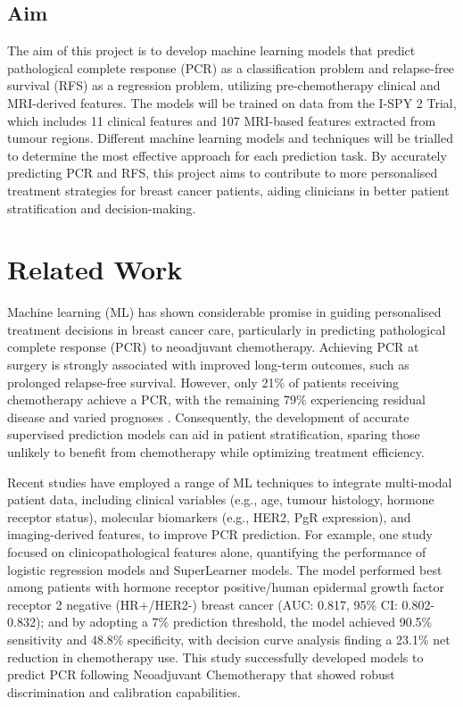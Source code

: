 \documentclass{article}
\begin{document}
\subsection{Aim}

The aim of this project is to develop machine learning models that predict pathological complete response (PCR) as a classification problem and relapse-free survival (RFS) as a regression problem, utilizing pre-chemotherapy clinical and MRI-derived features. The models will be trained on data from the I-SPY 2 Trial\cite{newitt2021acr}, which includes 11 clinical features and 107 MRI-based features extracted from tumour regions. Different machine learning models and techniques will be trialled to determine the most effective approach for each prediction task. By accurately predicting PCR and RFS, this project aims to contribute to more personalised treatment strategies for breast cancer patients, aiding clinicians in better patient stratification and decision-making.

\section{Related Work}

Machine learning (ML) has shown considerable promise in guiding personalised treatment decisions in breast cancer care, particularly in predicting pathological complete response (PCR) to neoadjuvant chemotherapy. Achieving PCR at surgery is strongly associated with improved long-term outcomes, such as prolonged relapse-free survival. However, only 21\% of patients receiving chemotherapy achieve a PCR, with the remaining 79\% experiencing residual disease and varied prognoses \cite{spring2020pathologic}. Consequently, the development of accurate supervised prediction models can aid in patient stratification, sparing those unlikely to benefit from chemotherapy while optimizing treatment efficiency.

Recent studies have employed a range of ML techniques to integrate multi-modal patient data, including clinical variables (e.g., age, tumour histology, hormone receptor status), molecular biomarkers (e.g., HER2, PgR expression), and imaging-derived features, to improve PCR prediction. For example, one study \cite{Zhao2024} focused on clinicopathological features alone, quantifying the performance of logistic regression models and SuperLearner models. The model performed best among patients with hormone receptor positive/human epidermal growth factor receptor 2 negative (HR+/HER2-) breast cancer (AUC: 0.817, 95\% CI: 0.802-0.832); and by adopting a 7\% prediction threshold, the model achieved 90.5\% sensitivity and 48.8\% specificity, with decision curve analysis finding a 23.1\% net reduction in chemotherapy use. This study successfully developed models to predict PCR following Neoadjuvant Chemotherapy that showed robust discrimination and calibration capabilities.
\end{document}
